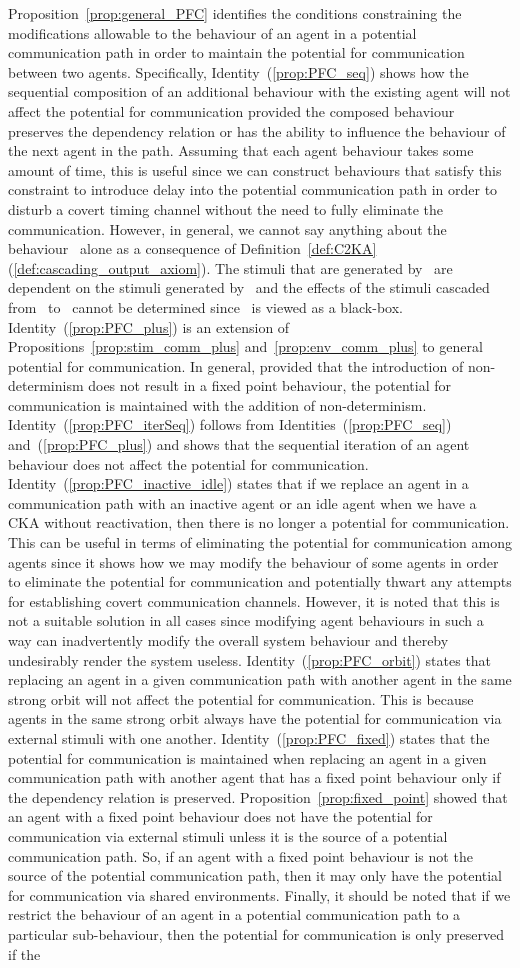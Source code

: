 \documentclass[copyright,creativecommons]{eptcs}
\makeatletter
\newcommand{\PFC}{potential for communication\@\xspace}
\newcommand{\CCKAabbrv}{CKA\@\xspace}
\makeatother
\begin{document}
Proposition~\ref{prop:general_PFC} identifies the conditions constraining the modifications allowable to the behaviour of an agent in a potential communication path in order to maintain the \PFC between two agents. Specifically, Identity~(\ref{prop:PFC_seq}) shows how the sequential composition of an additional behaviour with the existing agent will not affect the \PFC provided the composed behaviour preserves the dependency relation or has the ability to influence the behaviour of the next agent in the path. Assuming that each agent behaviour takes some amount of time, this is useful since we can construct behaviours that satisfy this constraint to introduce delay into the potential communication path in order to disturb a covert timing channel without the need to fully eliminate the communication. However, in general, we cannot say anything about the behaviour~ alone as a consequence of Definition~\ref{def:C2KA}(\ref{def:cascading_output_axiom}). The stimuli that are generated by~ are dependent on the stimuli generated by~ and the effects of the stimuli cascaded from~ to~ cannot be determined since~ is viewed as a black-box. Identity~(\ref{prop:PFC_plus}) is an extension of Propositions~\ref{prop:stim_comm_plus} and~\ref{prop:env_comm_plus} to general \PFC. In general, provided that the introduction of non-determinism does not result in a fixed point behaviour, the \PFC is maintained with the addition of non-determinism. Identity~(\ref{prop:PFC_iterSeq}) follows from Identities~(\ref{prop:PFC_seq}) and~(\ref{prop:PFC_plus}) and shows that the sequential iteration of an agent behaviour does not affect the \PFC. Identity~(\ref{prop:PFC_inactive_idle}) states that if we replace an agent in a communication path with an inactive agent or an idle agent when we have a \CCKAabbrv without reactivation, then there is no longer a \PFC. This can be useful in terms of eliminating the \PFC among agents since it shows how we may modify the behaviour of some agents in order to eliminate the \PFC and potentially thwart any attempts for establishing covert communication channels. However, it is noted that this is not a suitable solution in all cases since modifying agent behaviours in such a way can inadvertently modify the overall system behaviour and thereby undesirably render the system useless. Identity~(\ref{prop:PFC_orbit}) states that replacing an agent in a given communication path with another agent in the same strong orbit will not affect the \PFC. This is because agents in the same strong orbit always have the \PFC via external stimuli with one another. Identity~(\ref{prop:PFC_fixed}) states that the \PFC is maintained when replacing an agent in a given communication path with another agent that has a fixed point behaviour only if the dependency relation is preserved. Proposition~\ref{prop:fixed_point} showed that an agent with a fixed point behaviour does not have the \PFC via external stimuli unless it is the source of a potential communication path. So, if an agent with a fixed point behaviour is not the source of the potential communication path, then it may only have the \PFC via shared environments. Finally, it should be noted that if we restrict the behaviour of an agent in a potential communication path to a particular sub-behaviour, then the \PFC is only preserved if the 
\end{document}
